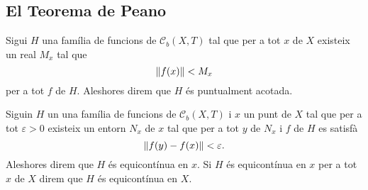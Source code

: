 \documentclass[../Apunts.tex]{subfiles}
\begin{document}
	\subsection{El Teorema de Peano}
	\begin{definition}
		\label{def:família de funcions puntualment acotada}
		Sigui \(H\) una família de funcions de \(\mathcal{C}_{b}(X,T)\) tal que per a tot \(x\) de \(X\) existeix un real \(M_{x}\) tal que
		\[\norm{f(x)}<M_{x}\]
		per a tot \(f\) de \(H\). Aleshores direm que \(H\) és puntualment acotada.
	\end{definition}
	\begin{definition}
		\label{def:família de funcions equicontínua en un punt}
		\label{def:família de funcions equicontínua}
		Siguin \(H\) un una família de funcions de \(\mathcal{C}_{b}(X,T)\) i \(x\) un punt de \(X\) tal que per a tot \(\varepsilon>0\) existeix un entorn \(N_{x}\) de \(x\) tal que per a tot \(y\) de \(N_{x}\) i \(f\) de \(H\) es satisfà
		\[\norm{f(y)-f(x)}<\varepsilon.\]
		Aleshores direm que \(H\) és equicontínua en \(x\). Si \(H\) és equicontínua en \(x\) per a tot \(x\) de \(X\) direm que \(H\) és equicontínua en \(X\).
	\end{definition}
\end{document}
